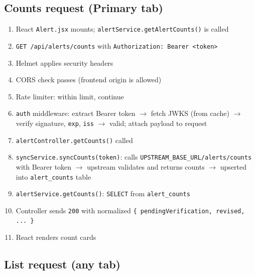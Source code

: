 \documentclass[11pt]{article}
\begin{document}
\subsection{Counts request (Primary tab)}

\begin{enumerate}
  \item React \texttt{Alert.jsx} mounts; \texttt{alertService.getAlertCounts()} is called
  \item \texttt{GET /api/alerts/counts} with \texttt{Authorization: Bearer \textless token\textgreater}
  \item Helmet applies security headers
  \item CORS check passes (frontend origin is allowed)
  \item Rate limiter: within limit, continue
  \item \texttt{auth} middleware: extract Bearer token $\rightarrow$ fetch JWKS (from cache) $\rightarrow$
        verify signature, \texttt{exp}, \texttt{iss} $\rightarrow$ valid; attach payload to request
  \item \texttt{alertController.getCounts()} called
  \item \texttt{syncService.syncCounts(token)}: calls \texttt{UPSTREAM\_BASE\_URL/alerts/counts}
        with Bearer token $\rightarrow$ upstream validates and returns counts $\rightarrow$ upserted
        into \texttt{alert\_counts} table
  \item \texttt{alertService.getCounts()}: \texttt{SELECT} from \texttt{alert\_counts}
  \item Controller sends \texttt{200} with normalized \texttt{\{ pendingVerification, revised, ... \}}
  \item React renders count cards
\end{enumerate}

\subsection{List request (any tab)}
\end{document}
